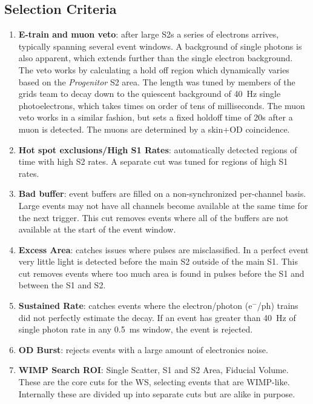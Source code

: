 \subsection{Selection Criteria}
\label{sec:dq_cuts}


\begin{enumerate}
    \item \textbf{E-train and muon veto}: after large S2s a series of electrons arrives, typically spanning several event windows. A background of single photons is also apparent, which extends further than the single electron background.
    The veto works by calculating a hold off region which dynamically varies based on the \textit{Progenitor} S2 area.
    The length was tuned by members of the grids team to decay down to the quiescent background of 40~Hz single photoelectrons, which takes times on order of tens of milliseconds.
    The muon veto works in a similar fashion, but sets a fixed holdoff time of 20s after a muon is detected. 
    The muons are determined by a skin+OD coincidence.
    \item \textbf{Hot spot exclusions/High S1 Rates}: automatically detected regions of time with high S2 rates.
    A separate cut was tuned for regions of high S1 rates.
    \item \textbf{Bad buffer}: event buffers are filled on a non-synchronized per-channel basis. 
    Large events may not have all channels become available at the same time for the next trigger.
    This cut removes events where all of the buffers are not available at the start of the event window.
    \item \textbf{Excess Area}: catches issues where pulses are misclassified. In a perfect event very little light is detected before the main S2 outside of the main S1. This cut removes events where too much area is found in pulses before the S1 and between the S1 and S2.
    \item \textbf{Sustained Rate}: catches events where the electron/photon (e$^-$/ph) trains did not perfectly estimate the decay. 
    If an event has greater than 40~Hz of single photon rate in any 0.5~ms window, the event is rejected.
    \item \textbf{OD Burst}: rejects events with a large amount of electronics noise.
    \item \textbf{WIMP Search ROI}: Single Scatter, S1 and S2 Area, Fiducial Volume. 
    These are the core cuts for the WS, selecting events that are WIMP-like.
    Internally these are divided up into separate cuts but are alike in purpose.

\end{enumerate}
